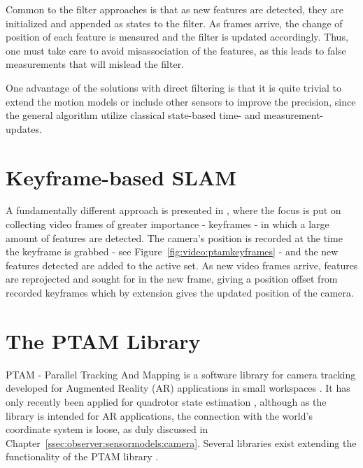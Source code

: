        Common to the filter approaches is that as new features are detected,
        they are initialized and appended as states to the filter.
        As frames arrive, the change of position of each feature is measured and
        the filter is updated accordingly.
        Thus, one must take care to avoid misassociation of the features, as
        this leads to false measurements that will mislead the filter.

        One advantage of the solutions with direct filtering is that it is quite
        trivial to extend the motion models or include other sensors to improve the precision, since
        the general algorithm utilize classical state-based time- and measurement-updates.

    \section{Keyframe-based SLAM}
    \label{eq:video:kfslam}
        A fundamentally different approach is presented in \citep{klein07parallel},
        where the focus is put on collecting video frames of greater importance - keyframes -
        in which a large amount of features are detected.
        The camera's position is recorded at the time the keyframe is grabbed - see Figure~\ref{fig:video:ptamkeyframes} -
        and the new features detected are added to the active set.
        As new video frames arrive, features are reprojected and sought for in
        the new frame, giving a position offset from recorded keyframes which by
        extension gives the updated position of the camera.


\pagebreak
    \section{The PTAM Library}
        PTAM - Parallel Tracking And Mapping is a software library for camera tracking
        developed for Augmented Reality (AR) applications in small workspaces \citep{klein07parallel}.
        It has only recently been applied for quadrotor state estimation \citep{weiss11monocular},
        although as the library is intended for AR applications, the connection
        with the world's coordinate system is loose, as duly discussed in Chapter~\ref{ssec:observer:sensormodels:camera}.
        Several libraries exist extending the functionality of the PTAM library \citep{Nguyen_Sandor_Park_2010}.

